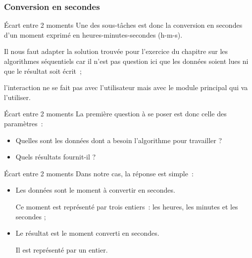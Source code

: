 \subsubsection{Conversion en secondes}

\begin{frame}{Écart entre 2 moments}
	Une des sous-tâches est donc la conversion en secondes
	d'un moment exprimé en heures-minutes-secondes
	(h-m-s). 
	
	\bigskip
	
	Il nous faut adapter la solution trouvée pour
	l'exercice du chapitre sur les algorithmes séquentiels
	car il n'est pas question ici que les données soient
	lues ni que le résultat soit écrit~; 
	
	\bigskip
	
	l'interaction ne
	se fait pas avec l'utilisateur mais avec le module
	principal qui va l'utiliser.
\end{frame}

\begin{frame}{Écart entre 2 moments}
	La première question à se poser est donc celle des paramètres~:

	\bigskip
	
	\begin{itemize}
	\item 
		Quelles sont les données dont a besoin l'algorithme
		pour travailler ?
	\item 
		Quels résultats fournit-il ?
	\end{itemize}
\end{frame}

\begin{frame}{Écart entre 2 moments}
	Dans notre cas, la réponse est simple~:

	\bigskip
	
	\begin{itemize}
	\item {
		Les données sont le moment à convertir en secondes. 
		
		Ce moment est
		représenté par trois entiers~: les heures, les minutes et les secondes
		;}
	\item {
		Le résultat est le moment converti en secondes. 
		
		Il est représenté par un entier.}
	\end{itemize}
\end{frame}

